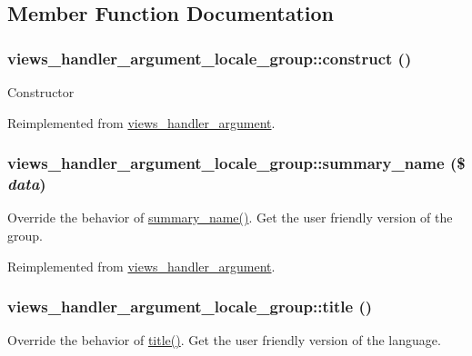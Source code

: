 \subsection{Member Function Documentation}
\hypertarget{classviews__handler__argument__locale__group_a5dd96da33f67166727c6af6547ccbb7a}{
\subsubsection[{construct}]{\setlength{\rightskip}{0pt plus 5cm}views\_\-handler\_\-argument\_\-locale\_\-group::construct ()}}
\label{classviews__handler__argument__locale__group_a5dd96da33f67166727c6af6547ccbb7a}
Constructor 

Reimplemented from \hyperlink{classviews__handler__argument_a93594a31e95e1a14cead4f038d7b321b}{views\_\-handler\_\-argument}.\hypertarget{classviews__handler__argument__locale__group_aeffcc011f90a9269f7793e089b994f71}{
\subsubsection[{summary\_\-name}]{\setlength{\rightskip}{0pt plus 5cm}views\_\-handler\_\-argument\_\-locale\_\-group::summary\_\-name (\$ {\em data})}}
\label{classviews__handler__argument__locale__group_aeffcc011f90a9269f7793e089b994f71}
Override the behavior of \hyperlink{classviews__handler__argument__locale__group_aeffcc011f90a9269f7793e089b994f71}{summary\_\-name()}. Get the user friendly version of the group. 

Reimplemented from \hyperlink{classviews__handler__argument_a4c55a340453eed4d35c69f7ac790cac1}{views\_\-handler\_\-argument}.\hypertarget{classviews__handler__argument__locale__group_a5eb8e22e84904fa604f785484befe86a}{
\subsubsection[{title}]{\setlength{\rightskip}{0pt plus 5cm}views\_\-handler\_\-argument\_\-locale\_\-group::title ()}}
\label{classviews__handler__argument__locale__group_a5eb8e22e84904fa604f785484befe86a}
Override the behavior of \hyperlink{classviews__handler__argument__locale__group_a5eb8e22e84904fa604f785484befe86a}{title()}. Get the user friendly version of the language. 


